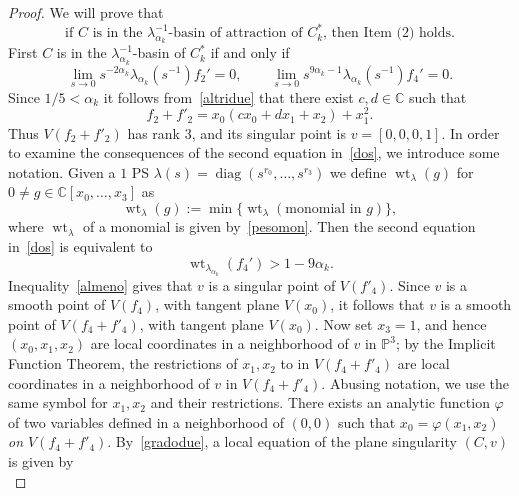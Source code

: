 \documentclass[11pt]{amsart}
\numberwithin{equation}{section}
\theoremstyle{plain}
\theoremstyle{remark}
\theoremstyle{definition}
\newcommand{\CC}{{\mathbb C}}
\newcommand{\PP}{{\mathbb P}}
\DeclareMathOperator{\diag}{diag}
\DeclareMathOperator{\weight}{wt}
\begin{document}
\begin{proof}
 We will prove that 
%
\begin{equation}\label{baffetto}
%
\text{if $C$ is in the $\lambda^{-1}_{\alpha_k}$-basin of attraction of $C^{*}_k$, then Item~(2) holds.}
%
\end{equation}
%
First $C$ is in the 
$\lambda^{-1}_{\alpha_k}$-basin of $C^{*}_k$ if and only if 
%
\begin{equation}\label{dos}
%
\lim\limits_{s\to 0}s^{-2\alpha_k}\lambda_{\alpha_k}(s^{-1})f_2'=0,\qquad 
\lim\limits_{s\to 0}s^{9\alpha_k-1}\lambda_{\alpha_k}(s^{-1})f_4'=0.
%
\end{equation}
%
Since $1/5<\alpha_k$ it follows from~\eqref{altridue} that there exist $c,d\in\CC$ such that 
%
\begin{equation}\label{gradodue}
%
f_2+f'_2=x_0(cx_0+dx_1+x_2)+x_1^2.
%
\end{equation}
%
Thus $V(f_2+f'_2)$ has rank $3$, and its singular point is $v=[0,0,0,1]$. In order to examine the consequences of the second equation in~\eqref{dos}, we introduce some notation. Given a $1$ PS $\lambda(s)=\diag(s^{r_0},\ldots,s^{r_3})$
we define $\weight_{\lambda}(g)$ for $0\not=g\in\CC[x_0,\ldots,x_3]$ as
%
\begin{equation}
%
\weight_{\lambda}(g):=\min\{\weight_{\lambda}(\text{monomial in $g$})\},
%
\end{equation}
%
where $\weight_{\lambda}$ of a monomial is given by~\eqref{pesomon}. Then the second equation in~\eqref{dos} is equivalent to 
%
%
\begin{equation}\label{almeno}
%
\weight_{\lambda_{\alpha_k}}(f_4')>1-9\alpha_k.
%
\end{equation}
%
Inequality~\eqref{almeno} gives that $v$ is a singular point of $V(f'_4)$. Since $v$ is a smooth point of $V(f_4)$, with tangent plane $V(x_0)$, it follows that  $v$ is a smooth point of $V(f_4+f'_4)$, with tangent plane $V(x_0)$. 
Now set $x_3=1$, and hence $(x_0,x_1,x_2)$ are local coordinates in a neighborhood of $v$ in $\PP^3$; by the Implicit Function Theorem, the restrictions of $x_1,x_2$ to  in $V(f_4+f'_4)$ are local coordinates in a neighborhood of $v$ in $V(f_4+f'_4)$. Abusing notation, we use the same symbol for $x_1,x_2$ and their restrictions. There exists an analytic function $\varphi$ of two variables defined in a neighborhood of  $(0,0)$ such that $x_0=\varphi(x_1,x_2)$ \emph{on $V(f_4+f'_4)$}. By~\eqref{gradodue}, a local equation of the plane singularity $(C,v)$ is given by
%
\begin{equation}\label{eqloc}

\end{equation}
\end{proof}
\end{document}
